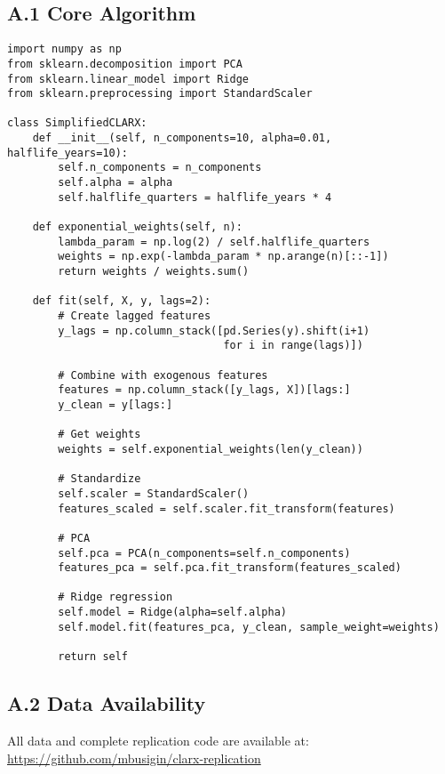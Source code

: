 \documentclass[11pt,letterpaper]{article}
\theoremstyle{plain}
\theoremstyle{definition}
\theoremstyle{remark}
\begin{document}
\subsection*{A.1 Core Algorithm}

\begin{verbatim}
import numpy as np
from sklearn.decomposition import PCA
from sklearn.linear_model import Ridge
from sklearn.preprocessing import StandardScaler

class SimplifiedCLARX:
    def __init__(self, n_components=10, alpha=0.01, halflife_years=10):
        self.n_components = n_components
        self.alpha = alpha
        self.halflife_quarters = halflife_years * 4
        
    def exponential_weights(self, n):
        lambda_param = np.log(2) / self.halflife_quarters
        weights = np.exp(-lambda_param * np.arange(n)[::-1])
        return weights / weights.sum()
        
    def fit(self, X, y, lags=2):
        # Create lagged features
        y_lags = np.column_stack([pd.Series(y).shift(i+1) 
                                  for i in range(lags)])
        
        # Combine with exogenous features
        features = np.column_stack([y_lags, X])[lags:]
        y_clean = y[lags:]
        
        # Get weights
        weights = self.exponential_weights(len(y_clean))
        
        # Standardize
        self.scaler = StandardScaler()
        features_scaled = self.scaler.fit_transform(features)
        
        # PCA
        self.pca = PCA(n_components=self.n_components)
        features_pca = self.pca.fit_transform(features_scaled)
        
        # Ridge regression
        self.model = Ridge(alpha=self.alpha)
        self.model.fit(features_pca, y_clean, sample_weight=weights)
        
        return self
\end{verbatim}

\subsection*{A.2 Data Availability}

All data and complete replication code are available at: \\
\url{https://github.com/mbusigin/clarx-replication}
\end{document}
